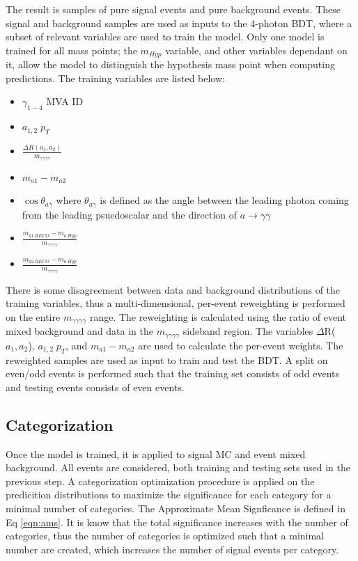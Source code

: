 \documentclass[12pt]{article}
\begin{document}
The result is samples of pure signal events and pure background events. These signal and background samples are used as inputs to the 4-photon BDT, where a subset of relevant variables are used to train the model. Only one model is trained for all mass points; the $m_{Hyp}$ variable, and other variables dependant on it, allow the model to distinguish the hypothesis mass point when computing predictions. The training variables are listed below:\par

\begin{itemize}
    \item $\gamma_{1-4}$ MVA ID
    \item $a_{1,2}\; p_T$
    \item $\frac{\Delta R(a_{1}, a_{2})}{m_{\gamma\gamma\gamma\gamma}}$
    \item $m_{a1} - m_{a2}$
    \item $\cos\theta_{a\gamma}$ where $\theta_{a\gamma}$ is defined as the angle between the leading photon coming from the leading psuedoscalar and the direction of $a\rightarrow\gamma\gamma$
    \item $\frac{m_{a1\,RECO} - m_{a\, Hyp}}{m_{\gamma\gamma\gamma\gamma}}$
    \item $\frac{m_{a2\,RECO} - m_{a\, Hyp}}{m_{\gamma\gamma\gamma\gamma}}$
\end{itemize}


There is some disagreement between data and background distributions of the training variables, thus a multi-dimensional, per-event reweighting is performed on the entire $m_{\gamma\gamma\gamma\gamma}$ range. The reweighting is calculated using the ratio of event mixed background and data in the $m_{\gamma\gamma\gamma\gamma}$ sideband region. The variables $\Delta$R($a_1,a_2$), $a_{1,2}\; p_T$, and $m_{a1} - m_{a2}$ are used to calculate the per-event weights. The reweighted samples are used as input to train and test the BDT. A split on even/odd events is performed such that the training set consists of odd events and testing events consists of even events.\par


\subsection{Categorization}
Once the model is trained, it is applied to signal MC and event mixed background. All events are considered, both training and testing sets used in the previous step. A categorization optimization procedure is applied on the predicition distributions to maximize the significance for each category for a minimal number of categories. The Approximate Mean Signficance is defined in Eq \ref{eqn:ams}. It is know that the total significance increases with the number of categories, thus the number of categories is optimized such that a minimal number are created, which increases the number of signal events per category.\par
\end{document}
